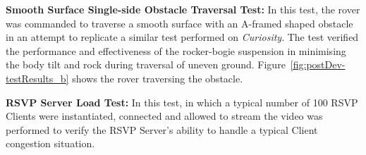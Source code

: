 \begin{TEST}
      \item\label{test:obstacleTest} \textbf{Smooth Surface Single-side Obstacle Traversal Test:} In this test, the rover was commanded to traverse a smooth surface with an A-framed shaped obstacle in an attempt to replicate a similar test performed on \textit{Curiosity}. The test verified the performance and effectiveness of the rocker-bogie suspension in minimising the body tilt and rock during traversal of uneven ground. Figure~\ref{fig:postDev-testResults_b} shows the rover traversing the obstacle.
      
      \item\label{test:serverLoadTest} \textbf{RSVP Server Load Test:} In this test, in which a typical number of 100 RSVP Clients were instantiated, connected and allowed to stream the video was performed to verify the RSVP Server's ability to handle a typical Client congestion situation.
    
    \end{TEST}